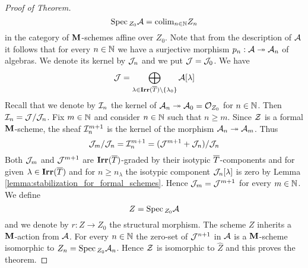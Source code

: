 \begin{proof}[Proof of Theorem]
$$\mathrm{Spec}\,_{Z_0}{\mathcal A} = \mathrm{colim}_{n\in {\mathbb N}}Z_n$$
in the category of $\mathbf{M}$-schemes affine over $Z_0$. Note that from the description of ${\mathcal A}$ it follows that for every $n\in {\mathbb N}$ we have a surjective morphism $p_n:{\mathcal A}\twoheadrightarrow {\mathcal A}_n$ of algebras. We denote its kernel by ${\mathcal J}_n$ and we put ${\mathcal J} = {\mathcal J}_0$. We have
$${\mathcal J}=\bigoplus_{\lambda \in \mathbf{Irr}(\overline{T})\setminus \{\lambda_0\}}{\mathcal A}[\lambda]$$
Recall that we denote by ${\mathcal I}_n$ the kernel of ${\mathcal A}_n\twoheadrightarrow {\mathcal A}_0={\mathcal O}_{Z_0}$ for $n\in {\mathbb N}$. Then ${\mathcal I}_n={\mathcal J}/{\mathcal J}_n$. Fix $m\in {\mathbb N}$ and consider $n\in {\mathbb N}$ such that $n\geq m$. Since ${\mathcal Z}$ is a formal $\mathbf{M}$-scheme, the sheaf ${\mathcal I}_n^{m+1}$ is the kernel of the morphism ${\mathcal A}_n\twoheadrightarrow {\mathcal A}_m$. Thus
$${\mathcal J}_m/{\mathcal J}_n={\mathcal I}_n^{m+1}=({\mathcal J}^{m+1}+{\mathcal J}_n)/{\mathcal J}_n$$
Both ${\mathcal J}_m$ and ${\mathcal J}^{m+1}$ are $\mathbf{Irr}(\overline{T})$-graded by their isotypic $\overline{T}$-components and for given $\lambda\in \mathbf{Irr}(\overline{T})$ and for $n \geq n_{\lambda}$ the isotypic component ${\mathcal J}_n[\lambda]$ is zero by Lemma \ref{lemma:stabilization_for_formal_schemes}. Hence ${\mathcal J}_m={\mathcal J}^{m+1}$ for every $m \in {\mathbb N}$.
We define
$$Z=\mathrm{Spec}\,_{Z_0}{\mathcal A}$$
and we denote by $r:Z\to Z_0$ the structural morphism. The scheme $Z$ inherits a $\mathbf{M}$-action from ${\mathcal A}$. For every $n\in {\mathbb N}$ the zero-set of ${\mathcal J}^{n+1}$ in ${\mathcal A}$ is a $\mathbf{M}$-scheme isomorphic to $Z_n = \mathrm{Spec}\,_{Z_0}{\mathcal A}_n$. Hence ${\mathcal Z}$ is isomorphic to $\widehat{Z}$ and this proves the theorem.
\end{proof}

